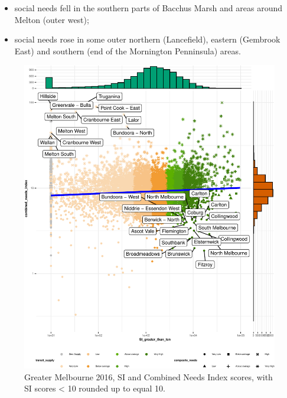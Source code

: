\documentclass[preprint, 3p,
authoryear]{elsarticle} %
\providecommand{\tightlist}{%
  \setlength{\itemsep}{0pt}\setlength{\parskip}{0pt}}
\begin{document}
\begin{itemize}
\tightlist
\item
  social needs fell in the southern parts of Bacchus Marsh and areas
  around Melton (outer west);
\item
  social needs rose in some outer northern (Lancefield), eastern
  (Gembrook East) and southern (end of the Mornington Penninsula) areas.
\end{itemize}

\begin{figure}
\centering
\includegraphics{ReynoldsCurrieQu2024_files/figure-latex/Greater_Melbourne_2016_needs_gap_scatterplot_figure-1.pdf}
\caption{Greater Melbourne 2016, SI and Combined Needs Index scores,
with SI scores \textless{} 10 rounded up to equal 10.}
\end{figure}


\end{document}
